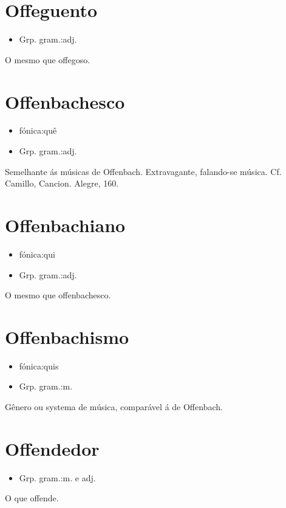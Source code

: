 \section{Offeguento}
\begin{itemize}
\item {Grp. gram.:adj.}
\end{itemize}
O mesmo que \textunderscore offegoso\textunderscore .
\section{Offenbachesco}
\begin{itemize}
\item {fónica:quê}
\end{itemize}
\begin{itemize}
\item {Grp. gram.:adj.}
\end{itemize}
Semelhante ás músicas de Offenbach.
Extravagante, falando-se música. Cf. Camillo, \textunderscore Cancion. Alegre\textunderscore , 160.
\section{Offenbachiano}
\begin{itemize}
\item {fónica:qui}
\end{itemize}
\begin{itemize}
\item {Grp. gram.:adj.}
\end{itemize}
O mesmo que \textunderscore offenbachesco\textunderscore .
\section{Offenbachismo}
\begin{itemize}
\item {fónica:quis}
\end{itemize}
\begin{itemize}
\item {Grp. gram.:m.}
\end{itemize}
Gênero ou systema de música, comparável á de Offenbach.
\section{Offendedor}
\begin{itemize}
\item {Grp. gram.:m.  e  adj.}
\end{itemize}
O que offende.
